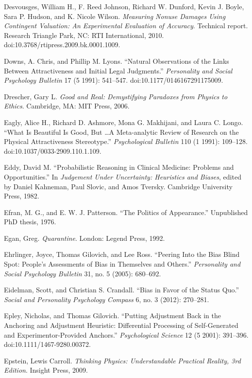 \documentclass[letterpaper]{book}
\begin{document}
{
 Desvousges, William H., F. Reed Johnson, Richard W. Dunford, Kevin
J. Boyle, Sara P. Hudson, and K. Nicole Wilson. \textit{Measuring
Nonuse Damages Using Contingent Valuation: An Experimental Evaluation
of Accuracy}. Technical report. Research Triangle Park, NC: RTI
International, 2010. doi:10.3768/rtipress.2009.bk.0001.1009.}

{
 Downs, A. Chris, and Phillip M. Lyons. ``Natural
Observations of the Links Between Attractiveness and Initial Legal
Judgments.'' \textit{Personality and Social
Psychology Bulletin} 17 (5 1991): 541--547.
doi:10.1177/0146167291175009.}

{
 Drescher, Gary L. \textit{Good and Real: Demystifying Paradoxes
from Physics to Ethics}. Cambridge, MA: MIT Press, 2006.}

{
 Eagly, Alice H., Richard D. Ashmore, Mona G. Makhijani, and Laura
C. Longo. ``What Is Beautiful Is Good, But \ldots A
Meta-analytic Review of Research on the Physical Attractiveness
Stereotype.'' \textit{Psychological Bulletin} 110 (1
1991): 109--128. doi:10.1037/0033-2909.110.1.109.}

{
 Eddy, David M. ``Probabilistic Reasoning in
Clinical Medicine: Problems and Opportunities.'' In
\textit{Judgement Under Uncertainty: Heuristics and Biases}, edited by
Daniel Kahneman, Paul Slovic, and Amos Tversky. Cambridge University
Press, 1982.}

{
 Efran, M. G., and E. W. J. Patterson. ``The
Politics of Appearance.'' Unpublished PhD thesis,
1976.}

{
 Egan, Greg. \textit{Quarantine}. London: Legend Press, 1992.}

{
 Ehrlinger, Joyce, Thomas Gilovich, and Lee Ross.
``Peering Into the Bias Blind Spot:
People's Assessments of Bias in Themselves and
Others.'' \textit{Personality and Social Psychology
Bulletin} 31, no. 5 (2005): 680--692.}

{
 Eidelman, Scott, and Christian S. Crandall.
``Bias in Favor of the Status Quo.''
\textit{Social and Personality Psychology Compass} 6, no. 3 (2012):
270--281.}

{
 Epley, Nicholas, and Thomas Gilovich. ``Putting
Adjustment Back in the Anchoring and Adjustment Heuristic: Differential
Processing of Self-Generated and Experimentor-Provided
Anchors.'' \textit{Psychological Science} 12 (5
2001): 391--396. doi:10.1111/1467-9280.00372.}

{
 Epstein, Lewis Carroll. \textit{Thinking Physics: Understandable
Practical Reality, 3rd Edition}. Insight Press, 2009.}
\end{document}
